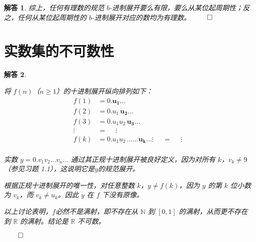\documentclass[12pt,UTF8]{ctexbook}
\theoremstyle{exercisestyle}
\theoremstyle{solutionstyle}
\newtheorem*{solution*}{解答}
\newenvironment{solution}
  {\begin{solution*}}
  {\hfill\ensuremath{\qed}\end{solution*}}
\begin{document}
\begin{solution}
综上，任何有理数的规范 $b$-进制展开要么有限，要么从某位起周期性；反之，任何从某位起周期性的 $b$-进制展开对应的数均为有理数。
\end{solution}

\section{实数集的不可数性}\label{non-dénombrabilité-de-r}
\begin{solution}
\begin{subquestions}
\item 将 $f(n)$（$n \geq 1$）的十进制展开纵向排列如下：
\begin{align*}
f(1) &= 0.\mathbf{u_1}\ldots \\
f(2) &= 0.u_1\,\mathbf{u_2}\ldots \\
f(3) &= 0.u_1u_2\,\mathbf{u_3}\ldots \\
\vdots\;\; &= \quad \;\vdots \\
f(k) &= 0.u_1u_2\,\ldots\ldots \mathbf{u_k}\ldots
\vdots\;\; &= \quad \;\vdots \\
\end{align*}

实数 $y = 0.v_1 v_2 \ldots v_n \ldots$ 通过其正规十进制展开被良好定义，因为对所有 $k$，$v_k \neq 9$（参见习题 1.1），这说明它是$y$的规范展开。

\item 根据正规十进制展开的唯一性，对任意整数 $k$，$y \neq f(k)$，因为 $y$ 的第 $k$ 位小数为 $v_k$，而 $v_k \neq u_k$。因此 $y$ 在 $f$ 下没有原像。

\item 以上讨论表明，$f$必然不是满射，即不存在从 $\mathbb{N}$ 到 $[0,1]$ 的满射，从而更不存在到 $\mathbb{R}$ 的满射。结论是 $\mathbb{R}$ 不可数。
\end{subquestions}
\end{solution}
\end{document}
